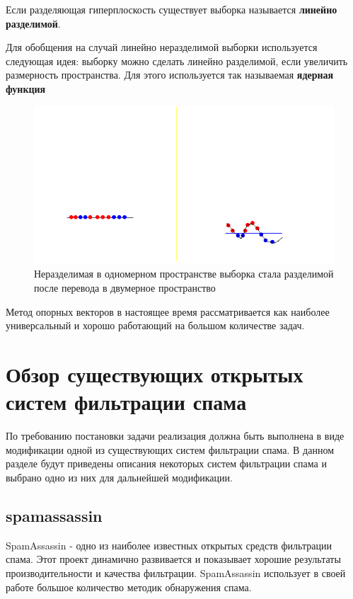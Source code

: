 Если разделяющая гиперплоскость существует выборка называется \textbf{линейно разделимой}.

Для обобщения на случай линейно неразделимой выборки используется следующая идея: выборку можно сделать линейно разделимой, если увеличить размерность пространства. Для этого используется так называемая \textbf{ядерная функция}

\begin{figure}[h]
\begin{center}
\includegraphics[width=15cm]{img/svm2}
\end{center}
\caption{Неразделимая в одномерном пространстве выборка стала разделимой после перевода в двумерное пространство}
\label{svm-kernel}
\end{figure}

Метод опорных векторов в настоящее время рассматривается как наиболее универсальный и хорошо работающий на большом количестве задач.

\section{Обзор существующих открытых систем фильтрации спама}
По требованию постановки задачи реализация должна быть выполнена в виде модификации одной из существующих систем фильтрации спама. В данном разделе будут приведены описания некоторых систем фильтрации спама и выбрано одно из них для дальнейшей модификации.
\subsection{spamassassin}
SpamAssassin - одно из наиболее известных открытых средств фильтрации спама. Этот проект динамично развивается и показывает хорошие результаты производительности и качества фильтрации. SpamAssassin использует в своей работе большое количество методик обнаружения спама.
